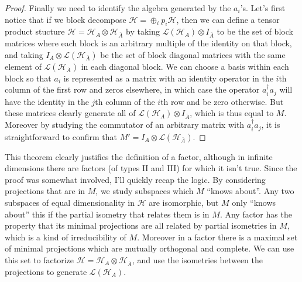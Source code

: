 \documentclass[12pt]{article}
\newcommand{\Ll}{\mathcal{L}}
\newcommand{\Hh}{\mathcal{H}}
\newcommand{\HA}{\mathcal{H}_A}
\newcommand{\HAb}{\mathcal{H}_{\ol{A}}}
\newcommand{\ol}{\overline}
\begin{document}
\begin{proof}
Finally we need to identify the algebra generated by the $a_i$'s.  Let's first notice that if we block decompose $\Hh=\oplus_i p_i \Hh$, then we can define a tensor product stucture $\Hh=\HA\otimes \HAb$ by taking $\Ll(\HA)\otimes I_{\ol{A}}$ to be the set of block matrices where each block is an arbitrary multiple of the identity on that block, and taking $I_A\otimes \Ll(\HAb)$ be the set of block diagonal matrices with the same element of $\Ll(\HAb)$ in each diagonal block.  We can choose a basis within each block so that $a_i$ is represented as a matrix with an identity operator in the $i$th column of the first row and zeros elsewhere, in which case the operator $a_i^\dagger a_j$ will have the identity in the $j$th column of the $i$th row and be zero otherwise.  But these matrices clearly generate all of $\Ll(\HA)\otimes I_{\ol{A}}$, which is thus equal to $M$.  Moreover by studying the commutator of an arbitrary matrix with $a^\dagger_i a_j$, it is straightforward to confirm that $M'=I_A\otimes \Ll(\HAb)$.
\end{proof}
This theorem clearly justifies the definition of a factor, although in infinite dimensions there are factors (of types II and III) for which it isn't true.  Since the proof was somewhat involved, I'll quickly recap the logic.  By considering projections that are in $M$, we study subspaces which $M$ ``knows about''.  Any two subspaces of equal dimensionality in $\Hh$ are isomorphic, but $M$ only ``knows about'' this if the partial isometry that relates them is in $M$.  Any factor has the property that its minimal projections are all related by partial isometries in $M$, which is a kind of irreducibility of $M$.  Moreover in a factor there is a maximal set of minimal projections which are mutually orthogonal and complete.  We can use this set to factorize $\mathcal{H}=\HA\otimes \HAb$, and use the isometries between the projections to generate $\Ll(\HA)$.  
\end{document}
